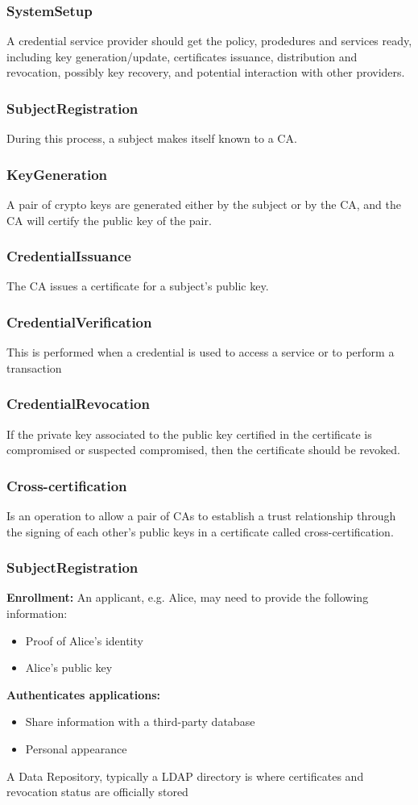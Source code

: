 \documentclass{article}
\begin{document}
\subsubsection{SystemSetup}
A credential service provider should get the policy, prodedures and services ready, including key generation/update, certificates issuance, distribution and revocation, possibly key recovery, and potential interaction with other providers.
\subsubsection{SubjectRegistration}
During this process, a subject makes itself known to a CA.
\subsubsection{KeyGeneration}
A pair of crypto keys are generated either by the subject or by the CA, and the CA will certify the public key of the pair.
\subsubsection{CredentialIssuance}
The CA issues a certificate for a subject's public key.
\subsubsection{CredentialVerification}
This is performed when a credential is used to access a service or to perform a transaction
\subsubsection{CredentialRevocation}
If the private key associated to the public key certified in the certificate is compromised or suspected compromised, then the certificate should be revoked.
\subsubsection{Cross-certification}
Is an operation to allow a pair of CAs to establish a trust relationship through the signing of each other's public keys in a certificate called cross-certification.
\subsubsection{SubjectRegistration}
\textbf{Enrollment:} An applicant, e.g. Alice, may need to provide the following information:
\begin{itemize}
  \item Proof of Alice's identity
  \item Alice's public key
\end{itemize}
\textbf{Authenticates applications:}
\begin{itemize}
  \item Share information with a third-party database
  \item Personal appearance
\end{itemize}
A Data Repository, typically a LDAP directory is where certificates and revocation status are officially stored
\end{document}
